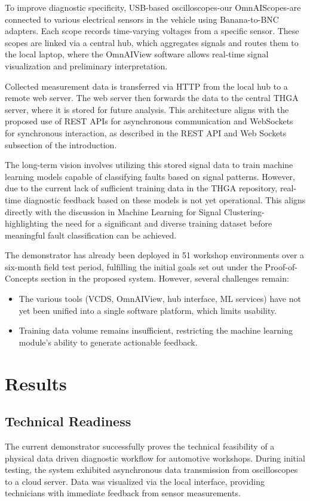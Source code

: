 To improve diagnostic specificity, USB-based oscilloscopes-our OmnAIScopes-are connected to various electrical sensors in the vehicle using Banana-to-BNC adapters. 
Each scope records time-varying voltages from a specific sensor. 
These scopes are linked via a central hub, which aggregates signals and routes them to the local laptop, where the OmnAIView software allows real-time signal visualization and preliminary interpretation.

Collected measurement data is transferred via HTTP from the local hub to a remote web server. 
The web server then forwards the data to the central THGA server, where it is stored for future analysis. 
This architecture aligns with the proposed use of REST APIs for asynchronous communication and WebSockets for synchronous interaction, as described in the REST API and Web Sockets subsection of the introduction.

The long-term vision involves utilizing this stored signal data to train machine learning models capable of classifying faults based on signal patterns. 
However, due to the current lack of sufficient training data in the THGA repository, real-time diagnostic feedback based on these models is not yet operational. 
This aligns directly with the discussion in Machine Learning for Signal Clustering-highlighting the need for a significant and diverse training dataset before meaningful fault classification can be achieved.

The demonstrator has already been deployed in 51 workshop environments over a six-month field test period, 
fulfilling the initial goals set out under the Proof-of-Concepts section in the proposed system. 
However, several challenges remain:
\begin{itemize}
  \item The various tools (VCDS, OmnAIView, hub interface, ML services) have not yet been unified into a single software platform, which limits usability.
  \item Training data volume remains insufficient, restricting the machine learning module’s ability to generate actionable feedback.
\end{itemize}



\section{Results}
\subsection{Technical Readiness}
The current demonstrator successfully proves the technical feasibility of a physical data driven diagnostic workflow for automotive workshops. 
During initial testing, the system exhibited asynchronous data transmission from oscilloscopes to a cloud server.
Data was visualized via the local interface, providing technicians with immediate feedback from sensor measurements.


